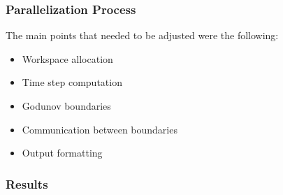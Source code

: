 \documentclass[12pt, a4paper, titlepage]{article}
\begin{document}
{\subsubsection{Parallelization Process}
The main points that needed to be adjusted were the following:

\begin{itemize}
\item Workspace allocation
\item Time step computation
\item Godunov boundaries
\item Communication between boundaries
\item Output formatting
\end{itemize} 


\subsubsection{Results}

}
\end{document}
